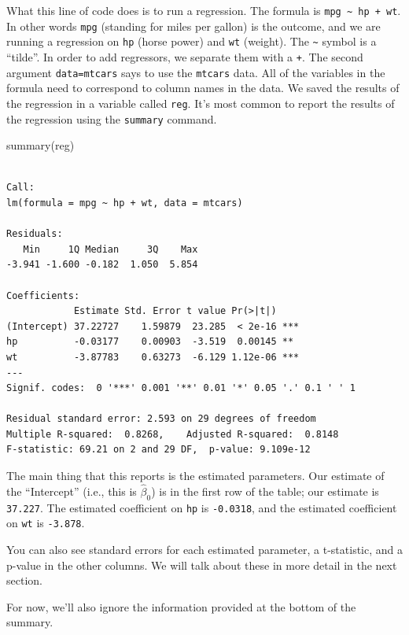 \documentclass[
  letterpaper,
  DIV=11,
  numbers=noendperiod]{scrreprt}
\newenvironment{Shaded}{\begin{snugshade}}{\end{snugshade}}
\newcommand{\FunctionTok}[1]{\textcolor[rgb]{0.28,0.35,0.67}{#1}}
\newcommand{\NormalTok}[1]{\textcolor[rgb]{0.00,0.23,0.31}{#1}}
\begin{document}
What this line of code does is to run a regression. The formula is
\texttt{mpg\ \textasciitilde{}\ hp\ +\ wt}. In other words \texttt{mpg}
(standing for miles per gallon) is the outcome, and we are running a
regression on \texttt{hp} (horse power) and \texttt{wt} (weight). The
\texttt{\textasciitilde{}} symbol is a ``tilde''. In order to add
regressors, we separate them with a \texttt{+}. The second argument
\texttt{data=mtcars} says to use the \texttt{mtcars} data. All of the
variables in the formula need to correspond to column names in the data.
We saved the results of the regression in a variable called
\texttt{reg}. It's most common to report the results of the regression
using the \texttt{summary} command.

\begin{Shaded}
\begin{Highlighting}[]
\FunctionTok{summary}\NormalTok{(reg)}
\end{Highlighting}
\end{Shaded}

\begin{verbatim}

Call:
lm(formula = mpg ~ hp + wt, data = mtcars)

Residuals:
   Min     1Q Median     3Q    Max 
-3.941 -1.600 -0.182  1.050  5.854 

Coefficients:
            Estimate Std. Error t value Pr(>|t|)    
(Intercept) 37.22727    1.59879  23.285  < 2e-16 ***
hp          -0.03177    0.00903  -3.519  0.00145 ** 
wt          -3.87783    0.63273  -6.129 1.12e-06 ***
---
Signif. codes:  0 '***' 0.001 '**' 0.01 '*' 0.05 '.' 0.1 ' ' 1

Residual standard error: 2.593 on 29 degrees of freedom
Multiple R-squared:  0.8268,    Adjusted R-squared:  0.8148 
F-statistic: 69.21 on 2 and 29 DF,  p-value: 9.109e-12
\end{verbatim}

The main thing that this reports is the estimated parameters. Our
estimate of the ``Intercept'' (i.e., this is \(\hat{\beta}_0\)) is in
the first row of the table; our estimate is \texttt{37.227}. The
estimated coefficient on \texttt{hp} is \texttt{-0.0318}, and the
estimated coefficient on \texttt{wt} is \texttt{-3.878}.

You can also see standard errors for each estimated parameter, a
t-statistic, and a p-value in the other columns. We will talk about
these in more detail in the next section.

For now, we'll also ignore the information provided at the bottom of the
summary.
\end{document}
